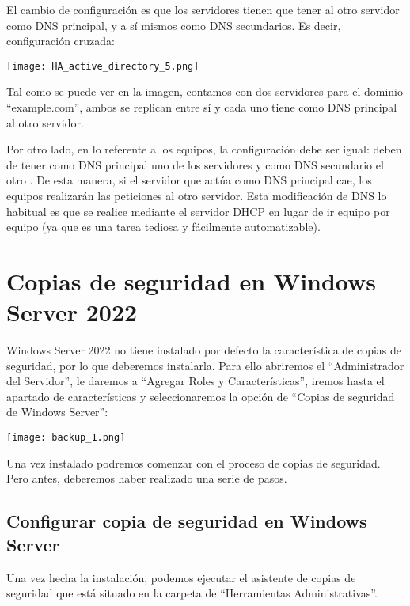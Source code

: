 El cambio de configuración es que los servidores tienen que tener al otro servidor como DNS principal, y a sí mismos como DNS secundarios. Es decir, configuración cruzada:

\begin{center}
    \vspace{-10pt}
    \texttt{[image: HA\_active\_directory\_5.png]}
    \vspace{-20pt}
\end{center}

Tal como se puede ver en la imagen, contamos con dos servidores para el dominio “example.com”, ambos se replican entre sí y cada uno tiene como DNS principal al otro servidor.

Por otro lado, en lo referente a los equipos, la configuración debe ser igual: deben de tener como DNS principal uno de los servidores y como DNS secundario el otro . De esta manera, si el servidor que actúa como DNS principal cae, los equipos realizarán las peticiones al otro servidor. Esta modificación de DNS lo habitual es que se realice mediante el servidor DHCP en lugar de ir equipo por equipo (ya que es una tarea tediosa y fácilmente automatizable).

\chapter{Copias de seguridad en Windows Server 2022}
Windows Server 2022 no tiene instalado por defecto la característica de copias de seguridad, por lo que deberemos instalarla. Para ello abriremos el “Administrador del Servidor”, le daremos a “Agregar Roles y Características”, iremos hasta el apartado de características y seleccionaremos la opción de “Copias de seguridad de Windows Server”:

\begin{center}
    \vspace{-20pt}
    \texttt{[image: backup\_1.png]}
    \vspace{-20pt}
\end{center}

Una vez instalado podremos comenzar con el proceso de copias de seguridad. Pero antes, deberemos haber realizado una serie de pasos.

\section{Configurar copia de seguridad en Windows Server}
Una vez hecha la instalación, podemos ejecutar el asistente de copias de seguridad que está situado en la carpeta de “Herramientas Administrativas”.

